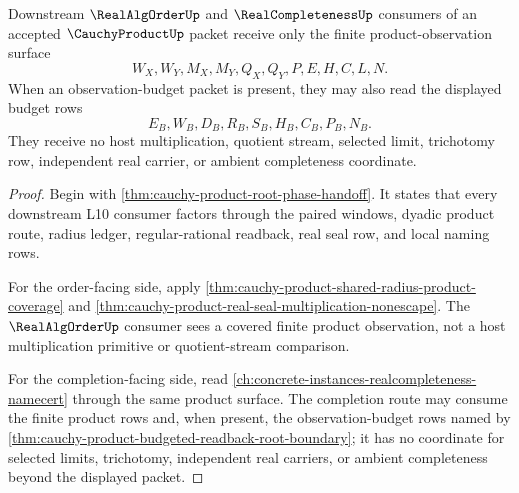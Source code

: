 \begin{theorem}
\label{thm:cauchy-product-downstream-unblock}
Downstream $\RealAlgOrderUp$ and $\RealCompletenessUp$ consumers of an accepted $\CauchyProductUp$ packet receive only the finite product-observation surface
$$
W_X,W_Y,M_X,M_Y,Q_X,Q_Y,P,E,H,C,L,N.
$$
When an observation-budget packet is present, they may also read the displayed budget rows
$$
E_B,W_B,D_B,R_B,S_B,H_B,C_B,P_B,N_B.
$$
They receive no host multiplication, quotient stream, selected limit, trichotomy row, independent real carrier, or ambient completeness coordinate.
\end{theorem}
\begin{proof}
Begin with \autoref{thm:cauchy-product-root-phase-handoff}. It states that every downstream L10 consumer factors through the paired windows, dyadic product route, radius ledger, regular-rational readback, real seal row, and local naming rows.

For the order-facing side, apply \autoref{thm:cauchy-product-shared-radius-product-coverage} and \autoref{thm:cauchy-product-real-seal-multiplication-nonescape}. The $\RealAlgOrderUp$ consumer sees a covered finite product observation, not a host multiplication primitive or quotient-stream comparison.

For the completion-facing side, read \autoref{ch:concrete-instances-realcompleteness-namecert} through the same product surface. The completion route may consume the finite product rows and, when present, the observation-budget rows named by \autoref{thm:cauchy-product-budgeted-readback-root-boundary}; it has no coordinate for selected limits, trichotomy, independent real carriers, or ambient completeness beyond the displayed packet.
\end{proof}

